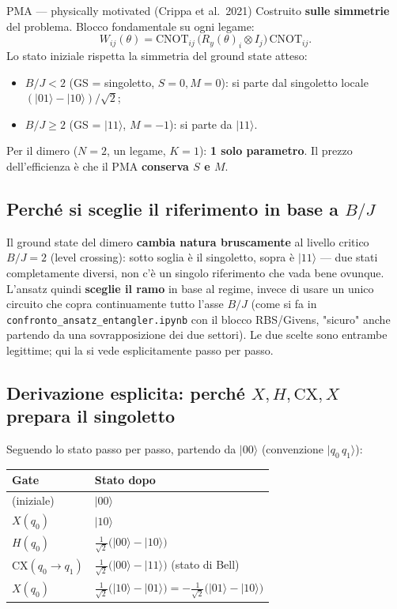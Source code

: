 \documentclass[11pt,a4paper]{article}
\begin{document}
\begin{panelbox}{PMA --- physically motivated (Crippa et al.\ 2021)}
Costruito \textbf{sulle simmetrie} del problema. Blocco fondamentale su
ogni legame:
$$W_{ij}(\theta) = \text{CNOT}_{ij}\,\big(R_y(\theta)_i\otimes I_j\big)\,\text{CNOT}_{ij}.$$
Lo stato iniziale rispetta la simmetria del ground state atteso:
\begin{itemize}[leftmargin=1.3em,itemsep=0.1em]
\item $B/J<2$ (GS = singoletto, $S=0,M=0$): si parte dal singoletto
locale $(|01\rangle-|10\rangle)/\sqrt2$;
\item $B/J\geq2$ (GS = $|11\rangle$, $M=-1$): si parte da $|11\rangle$.
\end{itemize}
Per il dimero ($N=2$, un legame, $K=1$): \textbf{1 solo parametro}. Il
prezzo dell'efficienza è che il PMA \textbf{conserva $S$ e $M$}.
\end{panelbox}

\subsection*{Perché si sceglie il riferimento in base a $B/J$}

Il ground state del dimero \textbf{cambia natura bruscamente} al livello
critico $B/J=2$ (level crossing): sotto soglia è il singoletto, sopra è
$|11\rangle$ --- due stati completamente diversi, non c'è un singolo
riferimento che vada bene ovunque. L'ansatz quindi \textbf{sceglie il
ramo} in base al regime, invece di usare un unico circuito che copra
continuamente tutto l'asse $B/J$ (come si fa in
\texttt{confronto\_ansatz\_entangler.ipynb} con il blocco RBS/Givens,
"sicuro" anche partendo da una sovrapposizione dei due settori). Le due
scelte sono entrambe legittime; qui la si vede esplicitamente passo per
passo.

\subsection*{Derivazione esplicita: perché $X,H,\mathrm{CX},X$ prepara il singoletto}

Seguendo lo stato passo per passo, partendo da $|00\rangle$ (convenzione
$|q_0\,q_1\rangle$):

\begin{center}
\renewcommand{\arraystretch}{1.25}
\begin{tabular}{@{}ll@{}}
\toprule
\rowcolor{inkblue!10}
\textbf{Gate} & \textbf{Stato dopo}\\
\midrule
(iniziale) & $|00\rangle$\\
$X(q_0)$ & $|10\rangle$\\
$H(q_0)$ & $\frac{1}{\sqrt2}\big(|00\rangle-|10\rangle\big)$\\
$\mathrm{CX}(q_0\to q_1)$ & $\frac{1}{\sqrt2}\big(|00\rangle-|11\rangle\big)$ (stato di Bell)\\
$X(q_0)$ & $\frac{1}{\sqrt2}\big(|10\rangle-|01\rangle\big)=-\frac{1}{\sqrt2}\big(|01\rangle-|10\rangle\big)$\\
\bottomrule
\end{tabular}
\end{center}
\end{document}
